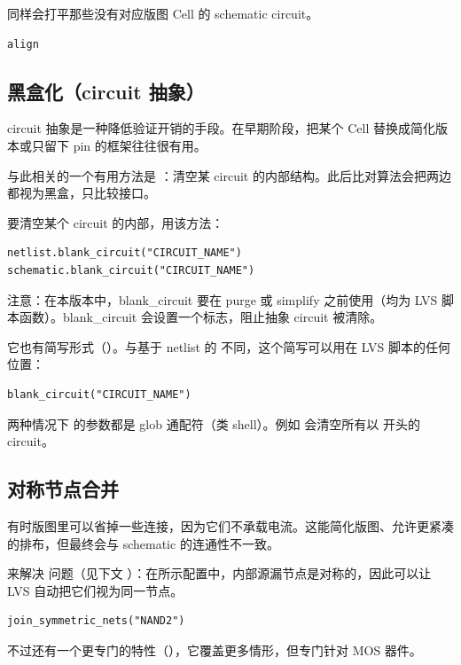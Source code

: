  同样会打平那些没有对应版图 Cell 的 schematic circuit。

\begin{lstlisting}
align
\end{lstlisting}

\subsection{黑盒化（circuit 抽象）}

circuit 抽象是一种降低验证开销的手段。在早期阶段，把某个 Cell 替换成简化版本或只留下 pin 的框架往往很有用。

与此相关的一个有用方法是 ：清空某 circuit 的内部结构。此后比对算法会把两边都视为黑盒，只比较接口。

要清空某个 circuit 的内部，用该方法：

\begin{lstlisting}
netlist.blank_circuit("CIRCUIT_NAME") schematic.blank_circuit("CIRCUIT_NAME")
\end{lstlisting}

注意：在本版本中，blank\_circuit 要在 purge 或 simplify 之前使用（均为 LVS 脚本函数）。blank\_circuit 会设置一个标志，阻止抽象 circuit 被清除。

它也有简写形式（）。与基于 netlist 的  不同，这个简写可以用在 LVS 脚本的任何位置：

\begin{lstlisting}
blank_circuit("CIRCUIT_NAME")
\end{lstlisting}

两种情况下  的参数都是 glob 通配符（类 shell）。例如  会清空所有以  开头的 circuit。

\subsection{对称节点合并}

有时版图里可以省掉一些连接，因为它们不承载电流。这能简化版图、允许更紧凑的排布，但最终会与 schematic 的连通性不一致。

来解决  问题（见下文 ）：在所示配置中，内部源漏节点是对称的，因此可以让 LVS 自动把它们视为同一节点。

\begin{lstlisting}
join_symmetric_nets("NAND2")
\end{lstlisting}

不过还有一个更专门的特性（），它覆盖更多情形，但专门针对 MOS 器件。

